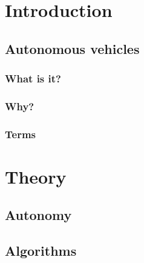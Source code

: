 \documentclass[conference]{IEEEtran}
\begin{document}

\begin{abstract}
\end{abstract}


%
\IEEEpeerreviewmaketitle

\section{Introduction}
 \subsection{Autonomous vehicles}
	 \subsubsection{What is it?}
	 \subsubsection{Why?}
	 \subsubsection{Terms}

\section{Theory}
 \subsection{Autonomy}
 \subsection{Algorithms}

\end{document}
